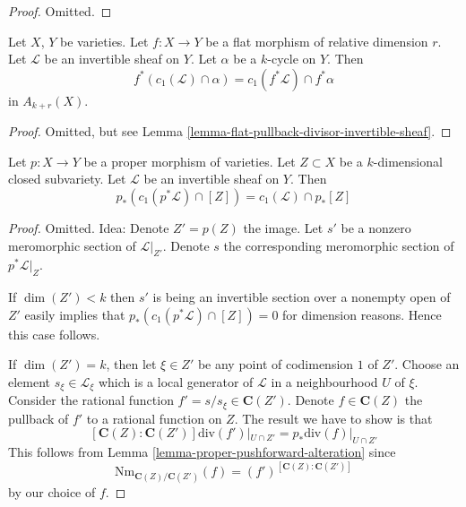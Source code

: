 \begin{proof}
Omitted.
\end{proof}

\begin{lemma}
\label{lemma-flat-pullback-cap-c1}
Let $X$, $Y$ be varieties. Let $f : X \to Y$ be a flat morphism of
relative dimension $r$. Let $\mathcal{L}$ be an invertible sheaf on $Y$.
Let $\alpha$ be a $k$-cycle on $Y$.
Then
$$
f^*(c_1(\mathcal{L}) \cap \alpha) = c_1(f^*\mathcal{L}) \cap f^*\alpha
$$
in $A_{k + r}(X)$.
\end{lemma}

\begin{proof}
Omitted, but see Lemma \ref{lemma-flat-pullback-divisor-invertible-sheaf}.
\end{proof}

\begin{lemma}
\label{lemma-pushforward-cap-c1}
Let $p : X \to Y$ be a proper morphism of varieties.
Let $Z \subset X$ be a $k$-dimensional closed subvariety.
Let $\mathcal{L}$ be an invertible sheaf on $Y$.
Then
$$
p_*(c_1(p^*\mathcal{L}) \cap [Z]) = c_1(\mathcal{L}) \cap p_*[Z]
$$
\end{lemma}

\begin{proof}
Omitted. Idea: Denote $Z' = p(Z)$ the image. Let $s'$ be a nonzero
meromorphic section of $\mathcal{L}|_{Z'}$. Denote $s$ the corresponding
meromorphic section of $p^*\mathcal{L}|_Z$. 

\medskip\noindent
If $\dim(Z') < k$ then $s'$ is being an invertible section  over a nonempty
open of $Z'$ easily implies that $p_*(c_1(p^*\mathcal{L}) \cap [Z]) = 0$
for dimension reasons. Hence this case follows.

\medskip\noindent
If $\dim(Z') = k$, then let $\xi \in Z'$ be any point of codimension
$1$ of $Z'$. Choose an element $s_\xi \in \mathcal{L}_\xi$ which
is a local generator of $\mathcal{L}$ in a neighbourhood $U$ of $\xi$.
Consider the rational function $f' = s/s_{\xi} \in \mathbf{C}(Z')$.
Denote $f \in \mathbf{C}(Z)$ the pullback of $f'$ to a rational function on
$Z$. The result we have to show is that
$$
[\mathbf{C}(Z) : \mathbf{C}(Z')] \text{div}(f')|_{U \cap Z'} =
p_*\text{div}(f)|_{U \cap Z'}
$$
This follows from Lemma \ref{lemma-proper-pushforward-alteration} since
$$
\text{Nm}_{\mathbf{C}(Z)/\mathbf{C}(Z')}(f)
=
(f')^{[\mathbf{C}(Z) : \mathbf{C}(Z')]}
$$
by our choice of $f$.
\end{proof}

